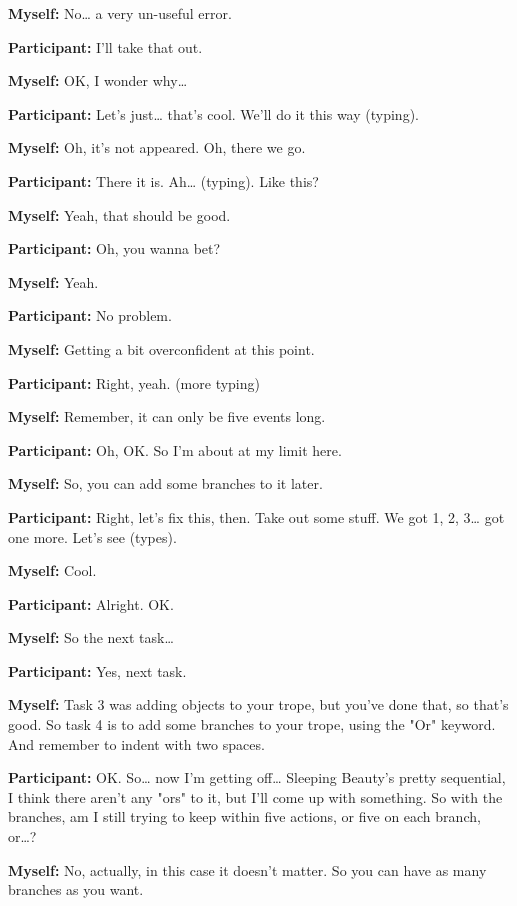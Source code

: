 \documentclass[11pt]{report}
\newcommand{\llabel}[1]{\hypertarget{llineno:#1}{\linelabel{#1}}}
\begin{document}
\begin{linenumbers}
\textbf{Myself:} No\ldots{} a very un-useful error.\llabel{lne:bug4g}

\textbf{Participant:} I'll take that out.

\textbf{Myself:} OK, I wonder why\ldots{}

\textbf{Participant:} Let's just\ldots{} that's cool. We'll do it this way (typing).

\textbf{Myself:} Oh, it's not appeared. Oh, there we go.

\textbf{Participant:} There it is. Ah\ldots{} (typing). Like this?\llabel{lne:bug1g}

\textbf{Myself:} Yeah, that should be good.

\textbf{Participant:} Oh, you wanna bet?

\textbf{Myself:} Yeah.

\textbf{Participant:} No problem.

\textbf{Myself:} Getting a bit overconfident at this point.

\textbf{Participant:} Right, yeah. (more typing)

\textbf{Myself:} Remember, it can only be five events long.

\textbf{Participant:} Oh, OK. So I'm about at my limit here.

\textbf{Myself:} So, you can add some branches to it later.

\textbf{Participant:} Right, let's fix this, then. Take out some stuff. We got 1, 2, 3\ldots{} got one more. Let's see (types).

\textbf{Myself:} Cool.

\textbf{Participant:} Alright. OK.

\textbf{Myself:} So the next task\ldots{}

\textbf{Participant:} Yes, next task.

\textbf{Myself:} Task 3 was adding objects to your trope, but you've done that, so that's good. So task 4 is to add some branches to your trope, using the "Or" keyword. And remember to indent with two spaces.

\textbf{Participant:} OK. So\ldots{} now I'm getting off\ldots{} Sleeping Beauty's pretty sequential, I think there aren't any "ors" to it, but I'll come up with something. So with the branches, am I still trying to keep within five actions, or five on each branch, or\ldots{}?

\textbf{Myself:} No, actually, in this case it doesn't matter. So you can have as many branches as you want.


\end{linenumbers}
\end{document}
